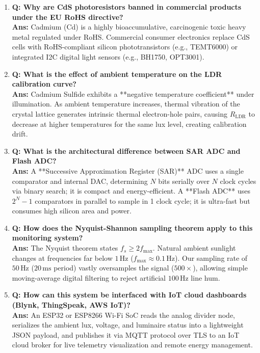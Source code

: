 \documentclass[10pt,a4paper]{article}
\begin{document}
\begin{enumerate}[leftmargin=*]
    \item \textbf{Q: Why are CdS photoresistors banned in commercial products under the EU RoHS directive?}\\
    \textbf{Ans:} Cadmium (Cd) is a highly bioaccumulative, carcinogenic toxic heavy metal regulated under RoHS. Commercial consumer electronics replace CdS cells with RoHS-compliant silicon phototransistors (e.g., TEMT6000) or integrated I2C digital light sensors (e.g., BH1750, OPT3001).

    \item \textbf{Q: What is the effect of ambient temperature on the LDR calibration curve?}\\
    \textbf{Ans:} Cadmium Sulfide exhibits a **negative temperature coefficient** under illumination. As ambient temperature increases, thermal vibration of the crystal lattice generates intrinsic thermal electron-hole pairs, causing $R_{\text{LDR}}$ to decrease at higher temperatures for the same lux level, creating calibration drift.

    \item \textbf{Q: What is the architectural difference between SAR ADC and Flash ADC?}\\
    \textbf{Ans:} A **Successive Approximation Register (SAR)** ADC uses a single comparator and internal DAC, determining $N$ bits serially over $N$ clock cycles via binary search; it is compact and energy-efficient. A **Flash ADC** uses $2^N - 1$ comparators in parallel to sample in 1 clock cycle; it is ultra-fast but consumes high silicon area and power.

    \item \textbf{Q: How does the Nyquist-Shannon sampling theorem apply to this monitoring system?}\\
    \textbf{Ans:} The Nyquist theorem states $f_s \ge 2 f_{\max}$. Natural ambient sunlight changes at frequencies far below $1\,\text{Hz}$ ($f_{\max} \approx 0.1\,\text{Hz}$). Our sampling rate of $50\,\text{Hz}$ ($20\,\text{ms}$ period) vastly oversamples the signal ($500 \times$), allowing simple moving-average digital filtering to reject artificial $100\,\text{Hz}$ line hum.

    \item \textbf{Q: How can this system be interfaced with IoT cloud dashboards (Blynk, ThingSpeak, AWS IoT)?}\\
    \textbf{Ans:} An ESP32 or ESP8266 Wi-Fi SoC reads the analog divider node, serializes the ambient lux, voltage, and luminaire status into a lightweight JSON payload, and publishes it via MQTT protocol over TLS to an IoT cloud broker for live telemetry visualization and remote energy management.


\end{enumerate}
\end{document}
